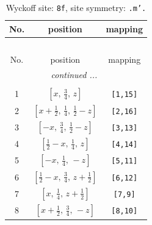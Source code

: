 \documentclass[fleqn,8pt]{jsarticle}
\begin{document}
\begin{longtable}{ccc}
\caption{Wyckoff site: {\tt 8f}, site symmetry: {\tt .m'.}}
 \\
 \hline \hline
No. & position & mapping \\ \hline \endfirsthead

\multicolumn{2}{l}{\tablename\ \thetable{}} \\
 \hline \hline
No. & position & mapping \\ \hline \endhead

 \hline \hline
\multicolumn{2}{r}{\footnotesize\it continued ...} \\ \endfoot

 \hline \hline
\multicolumn{2}{r}{} \\ \endlastfoot

1 & $\left[ x,\, \frac{3}{4},\, z \right]$ & {\tt [1,15]} \\ \hline
2 & $\left[ x + \frac{1}{2},\, \frac{1}{4},\, \frac{1}{2} - z \right]$ & {\tt [2,16]} \\ \hline
3 & $\left[ - x,\, \frac{3}{4},\, \frac{1}{2} - z \right]$ & {\tt [3,13]} \\ \hline
4 & $\left[ \frac{1}{2} - x,\, \frac{1}{4},\, z \right]$ & {\tt [4,14]} \\ \hline
5 & $\left[ - x,\, \frac{1}{4},\, - z \right]$ & {\tt [5,11]} \\ \hline
6 & $\left[ \frac{1}{2} - x,\, \frac{3}{4},\, z + \frac{1}{2} \right]$ & {\tt [6,12]} \\ \hline
7 & $\left[ x,\, \frac{1}{4},\, z + \frac{1}{2} \right]$ & {\tt [7,9]} \\ \hline
8 & $\left[ x + \frac{1}{2},\, \frac{3}{4},\, - z \right]$ & {\tt [8,10]} \\
\end{longtable}
\renewcommand{\arraystretch}{1.2}
\end{document}
